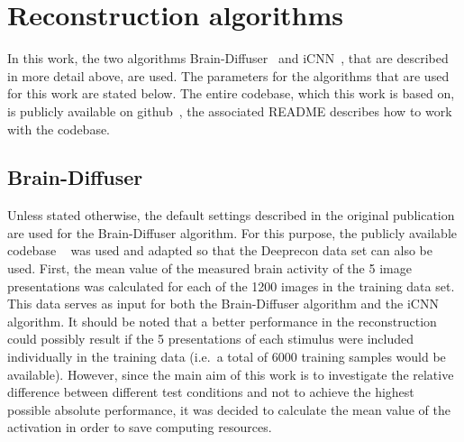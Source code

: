 


\section{Reconstruction algorithms}

In this work, the two algorithms Brain-Diffuser~\cite{ozcelikNaturalSceneReconstruction2023} and iCNN~\cite{shenDeepImageReconstruction2019}, that are described in more detail above, are used. The parameters for the algorithms that are used for this work are stated below. The entire codebase, which this work is based on, is publicly available on github~\cite{mildenbergerKamitaniLabBrain_diffuser}, the associated README describes how to work with the codebase. 

\subsection{Brain-Diffuser}
Unless stated otherwise, the default settings described in the original publication are used for the Brain-Diffuser algorithm. For this purpose, the publicly available codebase ~\cite{ozcelikOzcelikfuBraindiffuser2025} was used and adapted so that the Deeprecon data set can also be used.
First, the mean value of the measured brain activity of the 5 image presentations was calculated for each of the 1200 images in the training data set. This data serves as input for both the Brain-Diffuser algorithm and the iCNN algorithm. It should be noted that a better performance in the reconstruction could possibly result if the 5 presentations of each stimulus were included individually in the training data (i.e.\ a total of 6000 training samples would be available). However, since the main aim of this work is to investigate the relative difference between different test conditions and not to achieve the highest possible absolute performance, it was decided to calculate the mean value of the activation in order to save computing resources.


